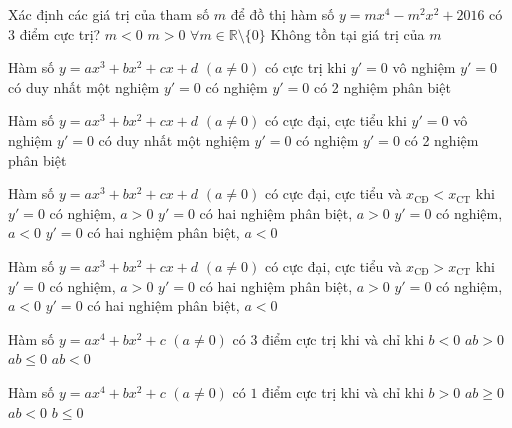\begin{ex}%
	Xác định các giá trị của tham số $m$ để đồ thị hàm số $y=mx^4-m^2x^2+2016$ có $3$ điểm cực trị?
	\choice
	{$m<0$}
	{\True $m>0$}
	{$\forall m\in\mathbb{R}\setminus\{0\}$}
	{Không tồn tại giá trị của $m$}
\end{ex}
\begin{ex}%
	Hàm số $y=ax^3+bx^2+cx+d$ $(a\neq 0)$ có cực trị khi
	\choice
	{$y'=0$ vô nghiệm}
	{$y'=0$ có duy nhất một nghiệm}
	{$y'=0$ có nghiệm}
	{\True $y'=0$ có 2 nghiệm phân biệt}
\loigiai
{
}
\end{ex}
\begin{ex}%
	Hàm số $y=ax^3+bx^2+cx+d$ $(a\neq 0)$ có cực đại, cực tiểu khi
	\choice
	{$y'=0$ vô nghiệm}
	{$y'=0$ có duy nhất một nghiệm}
	{$y'=0$ có nghiệm}
	{\True $y'=0$ có 2 nghiệm phân biệt}
\loigiai
{
}
\end{ex}
\begin{ex}%
	Hàm số $y=ax^3+bx^2+cx+d$ $(a\neq 0)$ có cực đại, cực tiểu và $x_{\text{CĐ}}<x_{\text{CT}}$ khi
	\choice
	{$y'=0$ có nghiệm, $a>0$}
	{\True $y'=0$ có hai nghiệm phân biệt, $a>0$}
	{$y'=0$ có nghiệm, $a<0$}
	{$y'=0$ có hai nghiệm phân biệt, $a<0$}
\loigiai
{
}
\end{ex}
\begin{ex}%
	Hàm số $y=ax^3+bx^2+cx+d$ $(a\neq 0)$ có cực đại, cực tiểu và $x_{\text{CĐ}}>x_{\text{CT}}$ khi
	\choice
	{$y'=0$ có nghiệm, $a>0$}
	{$y'=0$ có hai nghiệm phân biệt, $a>0$}
	{$y'=0$ có nghiệm, $a<0$}
	{\True $y'=0$ có hai nghiệm phân biệt, $a<0$}
\loigiai
{
}
\end{ex}
\begin{ex}%
	Hàm số $y=ax^4+bx^2+c$ $(a\neq 0)$ có $3$ điểm cực trị khi và chỉ khi
	\choice
	{$b<0$}
	{$ab>0$}
	{$ab\leq 0$}
	{\True $ab<0$}
\loigiai
{
}
\end{ex}
\begin{ex}%
	Hàm số $y=ax^4+bx^2+c$ $(a\neq 0)$ có $1$ điểm cực trị khi và chỉ khi
	\choice
	{$b>0$}
	{\True $ab\geq 0$}
	{$ab<0$}
	{$b\leq 0$}
\loigiai
{
}
\end{ex}
